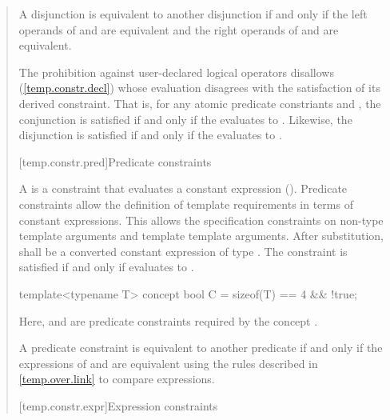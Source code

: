 \begin{quote}
A disjunction  is equivalent to another disjunction 
if and only if the left operands of  and  are equivalent
and the right operands of  and  are equivalent.

\pnum
\enternote
The prohibition against user-declared logical operators disallows
 (\ref{temp.constr.decl}) whose 
evaluation disagrees with the satisfaction of its derived constraint.
That is, for any atomic predicate constriants  and ,
the conjunction  is satisfied if and only if
the   evaluates to
. Likewise, the disjunction  is satisfied 
if and only if the  
evaluates to .
\exitnote


[temp.constr.pred]{Predicate constraints}

\pnum
A  is a constraint that evaluates a constant 
expression  ().
% 
\enternote
Predicate constraints allow the definition of template requirements
in terms of constant expressions. This allows the specification 
constraints on non-type template arguments and template template 
arguments.
\exitnote
% 
After substitution,  shall be a converted constant expression of 
type .
% 
The constraint is satisfied if and only if  evaluates to 
.
% 
\enterexample
\begin{codeblock}
template<typename T> concept bool C = sizeof(T) == 4 && !true;
\end{codeblock}
Here,  and  are 
predicate constraints required by the concept .
\exitexample

\pnum
A predicate constraint  is equivalent to another predicate
 if and only if the expressions of  and 
are equivalent using the rules described in \ref{temp.over.link} to compare
expressions.


[temp.constr.expr]{Expression constraints}


\end{quote}
